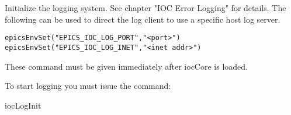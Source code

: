 Initialize the logging system. See chapter "IOC Error Logging" for details. The following can be used to direct the log 
client to use a specific host log server.

\begin{verbatim}epicsEnvSet("EPICS_IOC_LOG_PORT","<port>")
epicsEnvSet("EPICS_IOC_LOG_INET","<inet addr>")
\end{verbatim}These command must be given immediately after iocCore is loaded.

To start logging you must issue the command:

iocLogInit








